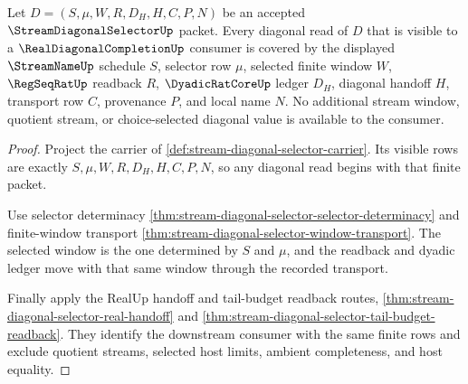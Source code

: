 \begin{theorem}
\label{thm:stream-diagonal-selector-window-coverage}
Let $D=(S,\mu,W,R,D_H,H,C,P,N)$ be an accepted $\StreamDiagonalSelectorUp$ packet. Every diagonal read of $D$ that is visible to a $\RealDiagonalCompletionUp$ consumer is covered by the displayed $\StreamNameUp$ schedule $S$, selector row $\mu$, selected finite window $W$, $\RegSeqRatUp$ readback $R$, $\DyadicRatCoreUp$ ledger $D_H$, diagonal handoff $H$, transport row $C$, provenance $P$, and local name $N$. No additional stream window, quotient stream, or choice-selected diagonal value is available to the consumer.
\end{theorem}
\begin{proof}
Project the carrier of \autoref{def:stream-diagonal-selector-carrier}. Its visible rows are exactly $S,\mu,W,R,D_H,H,C,P,N$, so any diagonal read begins with that finite packet.

Use selector determinacy \autoref{thm:stream-diagonal-selector-selector-determinacy} and finite-window transport \autoref{thm:stream-diagonal-selector-window-transport}. The selected window is the one determined by $S$ and $\mu$, and the readback and dyadic ledger move with that same window through the recorded transport.

Finally apply the RealUp handoff and tail-budget readback routes, \autoref{thm:stream-diagonal-selector-real-handoff} and \autoref{thm:stream-diagonal-selector-tail-budget-readback}. They identify the downstream consumer with the same finite rows and exclude quotient streams, selected host limits, ambient completeness, and host equality.
\end{proof}


